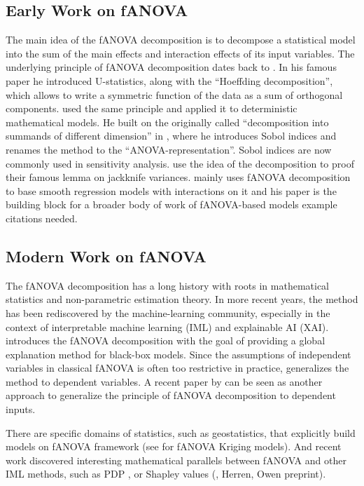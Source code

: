 
\subsection{Early Work on fANOVA}
The main idea of the fANOVA decomposition is to decompose a statistical model into the sum of the main effects and interaction effects of its input variables. The underlying principle of fANOVA decomposition dates back to \cite{hoeffding1948}. In his famous paper he introduced U-statistics, along with the ``Hoeffding decomposition'', which allows to write a symmetric function of the data as a sum of orthogonal components. \cite{sobol1993sensitivity} used the same principle and applied it to deterministic mathematical models.
He built on the originally called ``decomposition into summands of different dimension'' in \cite{sobol2001}, where he introduces Sobol indices and renames the method to the ``ANOVA-representation''. Sobol indices are now commonly used in sensitivity analysis. \cite{efron1981} use the idea of the decomposition to proof their famous lemma on jackknife variances. \cite{stone1994} mainly uses fANOVA decomposition to base smooth regression models with interactions on it and his paper is the building block for a broader body of work of fANOVA-based models {\color{blue}example citations needed}.


\subsection{Modern Work on fANOVA}
The fANOVA decomposition has a long history with roots in mathematical statistics and non-parametric estimation theory. In more recent years, the method has been rediscovered by the machine-learning community, especially in the context of interpretable machine learning (IML) and explainable AI (XAI). \cite{hooker2004} introduces the fANOVA decomposition with the goal of providing a global explanation method for black-box models. Since the assumptions of independent variables in classical fANOVA is often too restrictive in practice, \cite{hooker2007} generalizes the method to dependent variables. A recent paper by \cite{ilidrissi2025} can be seen as another approach to generalize the principle of fANOVA decomposition to dependent inputs.\par
There are specific domains of statistics, such as geostatistics, that explicitly build models on fANOVA framework (see \cite{muehlenstaedt2012} for fANOVA Kriging models). And recent work discovered interesting mathematical parallels between fANOVA and other IML methods, such as PDP \cite{friedman2001}, or Shapley values (\cite{fumagalli2025}, Herren, Owen preprint).

